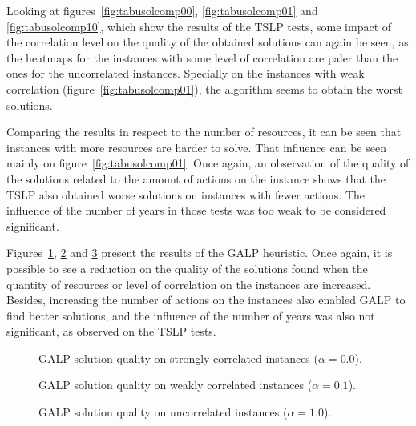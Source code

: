 Looking at figures~\ref{fig:tabusolcomp00}, \ref{fig:tabusolcomp01} and \ref{fig:tabusolcomp10}, which show the results of the TSLP tests, some impact of
the correlation level on the quality of the obtained solutions can again be seen, as the heatmaps for the instances with some level of correlation
are paler than the ones for the uncorrelated instances. Specially on the instances with weak correlation (figure~\ref{fig:tabusolcomp01}), the algorithm seems
to obtain the worst solutions.

Comparing the results in respect to the number of resources, it can be seen that instances with more resources are harder to solve. That influence
can be seen mainly on figure~\ref{fig:tabusolcomp01}. Once again, an observation of the quality of the solutions related to the amount of actions on the instance
shows that the TSLP also obtained worse solutions on instances with fewer actions. The influence of the number of years in those tests was too weak to be 
considered significant.

Figures~\ref{fig:greedysolcomp00}, \ref{fig:greedysolcomp01} and \ref{fig:greedysolcomp10} present the results of the GALP heuristic.
Once again, it is possible to see a reduction on the quality of the solutions found when the quantity of resources or level of correlation on
the instances are increased. Besides, increasing the number of actions on the instances also enabled GALP to find better solutions, and
the influence of the number of years was also not significant, as observed on the TSLP tests.

\begin{figure}[H]
  \centering
    \subfloat[1 resource]{} 
    \subfloat[2 resources]{}
    \subfloat[4 resources]{} 
  \caption{GALP solution quality on strongly correlated instances ($\alpha = 0.0$).}
  \label{fig:greedysolcomp00}
\end{figure}

\begin{figure}[H]
  \centering
    \subfloat[1 resource]{} 
    \subfloat[2 resources]{}
    \subfloat[4 resources]{}
  \caption{GALP solution quality on weakly correlated instances ($\alpha = 0.1$).}
  \label{fig:greedysolcomp01}
\end{figure}

\begin{figure}[H]
  \centering
    \subfloat[1 resource]{} 
    \subfloat[2 resources]{}
    \subfloat[4 resources]{}
  \caption{GALP solution quality on uncorrelated instances ($\alpha = 1.0$).}
  \label{fig:greedysolcomp10}
\end{figure}

